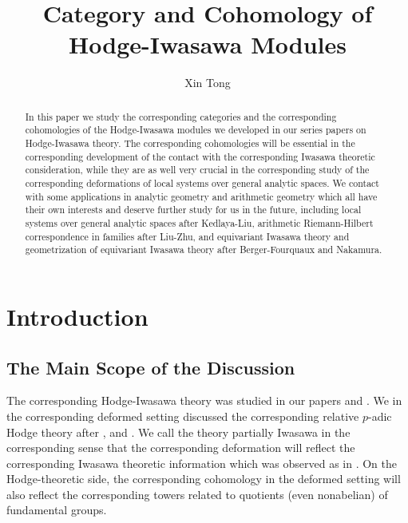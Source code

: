 \documentclass[12pt]{amsart}
\theoremstyle{definition}
\numberwithin{equation}{section}
\begin{document}
\normalfont



\title{Category and Cohomology of Hodge-Iwasawa Modules}
\author{Xin Tong}



\maketitle


\begin{abstract}
\rm In this paper we study the corresponding categories and the corresponding cohomologies of the Hodge-Iwasawa modules we developed in our series papers on Hodge-Iwasawa theory. The corresponding cohomologies will be essential in the corresponding development of the contact with the corresponding Iwasawa theoretic consideration, while they are as well very crucial in the corresponding study of the corresponding deformations of local systems over general analytic spaces. We contact with some applications in analytic geometry and arithmetic geometry which all have their own interests and deserve further study for us in the future, including local systems over general analytic spaces after Kedlaya-Liu, arithmetic Riemann-Hilbert correspondence in families after Liu-Zhu, and equivariant Iwasawa theory and geometrization of equivariant Iwasawa theory after Berger-Fourquaux and Nakamura.
\end{abstract}



\newpage

\tableofcontents


\newpage



\section{Introduction}

\subsection{The Main Scope of the Discussion}

\noindent The corresponding Hodge-Iwasawa theory was studied in our papers \cite{XT1} and \cite{XT2}. We in the corresponding deformed setting discussed the corresponding relative $p$-adic Hodge theory after \cite{KP}, \cite{KL15} and \cite{KL16}. We call the theory partially Iwasawa in the corresponding sense that the corresponding deformation will reflect the corresponding Iwasawa theoretic information which was observed as in \cite{KP}. On the Hodge-theoretic side, the corresponding cohomology in the deformed setting will also reflect the corresponding towers related to quotients (even nonabelian) of fundamental groups.\\
\end{document}
